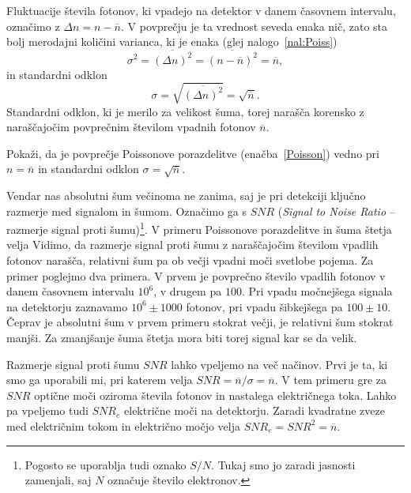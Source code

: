 Fluktuacije števila fotonov, ki vpadejo na detektor v danem časovnem 
intervalu, označimo z $\Delta n = n-\overline{n}$. V povprečju je ta vrednost seveda enaka nič, 
zato sta bolj merodajni količini varianca, ki je enaka (glej nalogo~\ref{nal:Poiss})
\begin{equation}
\sigma^2 = \overline{(\Delta n)^2}= \overline{(n-\overline{n})^2} = \overline{n},
\label{varianca}
\end{equation}
in standardni odklon
\begin{equation}
\sigma = \sqrt{\overline{(\Delta n)^2}} = \sqrt{\overline{n}}.
\label{sigma}
\end{equation}
Standardni odklon, ki je merilo za velikost šuma, torej narašča korensko 
z naraščajočim povprečnim številom vpadnih fotonov $\overline{n}$. 
\begin{definition}
Pokaži, da je povprečje Poissonove porazdelitve (enačba~\ref{Poisson}) vedno pri $n = \overline{n}$
in standardni odklon $\sigma = \sqrt{\overline{n}}$.
\label{nal:Poiss}
\end{definition}

Vendar nas absolutni šum večinoma ne zanima, 
saj je pri detekciji ključno razmerje med signalom in šumom. 
Označimo ga s $SNR$ ({\it Signal to Noise Ratio} --
razmerje 
signal proti šumu)\footnote{Pogosto se uporablja tudi oznako $S/N$. Tukaj smo jo 
zaradi jasnosti zamenjali, saj $N$ označuje število elektronov.}.
V primeru Poissonove porazdelitve in šuma štetja velja
Vidimo, da razmerje signal proti šumu z naraščajočim številom vpadlih fotonov narašča, 
relativni šum pa ob večji vpadni moči svetlobe pojema. 
Za primer poglejmo dva primera. V prvem je povprečno število vpadlih 
fotonov v danem časovnem intervalu $10^6$, v drugem pa $100$. 
Pri vpadu močnejšega signala 
na detektorju zaznavamo $10^6 \pm 1000$ fotonov, pri vpadu šibkejšega
pa $100 \pm 10$. Čeprav je absolutni šum v prvem primeru stokrat večji, 
je relativni šum stokrat manjši. Za zmanjšanje šuma štetja mora biti 
torej signal kar se da velik. 

\begin{remark}
Razmerje signal proti šumu $SNR$ lahko vpeljemo na več načinov. Prvi je ta, ki smo ga 
uporabili mi, pri katerem velja $SNR = \overline{n}/\sigma = \overline{n}$. V tem primeru
gre za $SNR$ optične moči oziroma števila fotonov in nastalega električnega toka. Lahko
pa vpeljemo tudi $SNR_e$ električne moči na detektorju.
Zaradi kvadratne zveze med električnim tokom in električno močjo velja 
$SNR_e=SNR^2={\overline{n}}$.
\end{remark}

